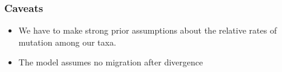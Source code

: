\begin{frame}
    \frametitle{Caveats}
    \begin{itemize}
        \item We have to make strong prior assumptions about the relative rates
            of mutation among our taxa.

        \bigskip
        \item The model assumes no migration after divergence
    \end{itemize}
\end{frame}

